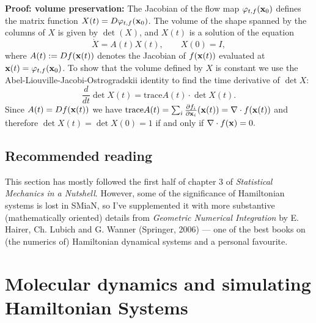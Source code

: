 \documentclass{article}
\begin{document}
{\bf Proof: volume preservation:}
The Jacobian of the flow map $\varphi_{t,f}({\bf x}_0)$ defines the matrix function $X(t)=D\varphi_{t,f}({\bf x}_0)$. The volume of the shape spanned by the columns of $X$ is given by $\det(X)$, and $X(t)$ is a solution of the equation
$$
\dot{X}=A(t)X(t),\qquad X(0)=I,
$$
where $A(t):=Df({\bf x}(t))$ denotes the Jacobian of $f({\bf x}(t))$ evaluated at ${\bf x}(t)=\varphi_{t,f}({\bf x}_0)$. To show that the volume defined by $X$ is constant we use  the Abel-Liouville-Jacobi-Ostrogradskii identity to find the time derivative of $\det X$:
$$
\frac{d}{dt}\det X(t)=\text{trace} A(t)\cdot\det X(t).
$$
Since $A(t)=Df({\bf x}(t))$ we have $\text{trace} A(t)=\sum_i\frac{\partial f_i}{\partial {\bf x}_i}({\bf x}(t))=\nabla\cdot f({\bf x}(t))$ and therefore $\det X(t)=\det X(0)=1$ if and only if $\nabla\cdot f({\bf x})=0.$

\subsection{Recommended reading}
This section has mostly followed the first half of chapter 3 of \emph{Statistical Mechanics in a Nutshell}. However, some of the significance of Hamiltonian systems is lost in SMiaN, so I've supplemented it with more substantive (mathematically oriented) details from \emph{Geometric Numerical Integration} by E. Hairer, Ch. Lubich and G. Wanner (Springer, 2006) --- one of the best books on (the numerics of) Hamiltonian dynamical systems and a personal favourite.

\section{Molecular dynamics and simulating Hamiltonian Systems}
\end{document}

